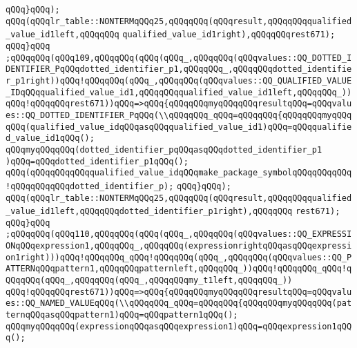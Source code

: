 \verb|qQQq}qQQq);|\newline
\verb|qQQq(qQQqlr_table::NONTERMqQQq25,qQQqqQQq(qQQqresult,qQQqqQQqqualified_value_id1left,qQQqqQQq|\newline
\verb|qualified_value_id1right),qQQqqQQqrest671);|\newline
\verb|qQQq}qQQq|\newline
\verb|;qQQqqQQq(qQQq109,qQQqqQQq(qQQq(qQQq_,qQQqqQQq(qQQqvalues::QQ_DOTTED_IDENTIFIER_PqQQqdotted_identifier_p1,qQQqqQQq_,qQQqqQQqdotted_identifier_p1right))qQQq!qQQqqQQq(qQQq_,qQQqqQQq(qQQqvalues::QQ_QUALIFIED_VALUE_IDqQQqqualified_value_id1,qQQqqQQqqualified_value_id1left,qQQqqQQq_))|\newline
\verb|qQQq!qQQqqQQqrest671))qQQq=>qQQq{qQQqqQQqmyqQQqqQQqresultqQQq=qQQqvalues::QQ_DOTTED_IDENTIFIER_PqQQq(\\qQQqqQQq_qQQq=qQQqqQQq{qQQqqQQqmyqQQqqQQq(qualified_value_idqQQqasqQQqqualified_value_id1)qQQq=qQQqqualified_value_id1qQQq();|\newline
\verb|qQQqmyqQQqqQQq(dotted_identifier_pqQQqasqQQqdotted_identifier_p1|\newline
\verb|)qQQq=qQQqdotted_identifier_p1qQQq();|\newline
\verb|qQQq(qQQqqQQqqQQqqualified_value_idqQQqmake_package_symbolqQQqqQQqqQQq!qQQqqQQqqQQqdotted_identifier_p);|\newline
\verb|qQQq}qQQq);|\newline
\verb|qQQq(qQQqlr_table::NONTERMqQQq25,qQQqqQQq(qQQqresult,qQQqqQQqqualified_value_id1left,qQQqqQQqdotted_identifier_p1right),qQQqqQQq|\newline
\verb|rest671);|\newline
\verb|qQQq}qQQq|\newline
\verb|;qQQqqQQq(qQQq110,qQQqqQQq(qQQq(qQQq_,qQQqqQQq(qQQqvalues::QQ_EXPRESSIONqQQqexpression1,qQQqqQQq_,qQQqqQQq(expressionrightqQQqasqQQqexpression1right)))qQQq!qQQqqQQq_qQQq!qQQqqQQq(qQQq_,qQQqqQQq(qQQqvalues::QQ_PATTERNqQQqpattern1,qQQqqQQqpatternleft,qQQqqQQq_))qQQq!qQQqqQQq_qQQq!qQQqqQQq(qQQq_,qQQqqQQq(qQQq_,qQQqqQQqmy_t1left,qQQqqQQq_))|\newline
\verb|qQQq!qQQqqQQqrest671))qQQq=>qQQq{qQQqqQQqmyqQQqqQQqresultqQQq=qQQqvalues::QQ_NAMED_VALUEqQQq(\\qQQqqQQq_qQQq=qQQqqQQq{qQQqqQQqmyqQQqqQQq(patternqQQqasqQQqpattern1)qQQq=qQQqpattern1qQQq();|\newline
\verb|qQQqmyqQQqqQQq(expressionqQQqasqQQqexpression1)qQQq=qQQqexpression1qQQq();|\newline
